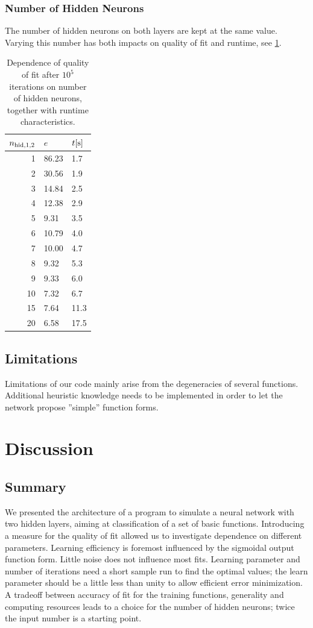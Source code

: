 \documentclass[useAMS,usenatbib]{mn2e}
\begin{document}
\subsubsection{Number of Hidden Neurons}
The number of hidden neurons on both layers are kept at the same
value. Varying this number has both impacts on quality of fit and
runtime, see \ref{tab:run}.
\begin{table}
\begin{center}
\begin{tabular}{rll}\hline\hline
$n_{{\rm hid,1,2}}$&$e$&$t[{\rm s}]$\\
\hline
 1&86.23& 1.7\\
 2&30.56& 1.9\\
 3&14.84& 2.5\\
 4&12.38& 2.9\\
 5& 9.31& 3.5\\
 6&10.79& 4.0\\
 7&10.00& 4.7\\
 8& 9.32& 5.3\\
 9& 9.33& 6.0\\
10& 7.32& 6.7\\
\hline
15& 7.64&11.3\\
\hline
20& 6.58&17.5\\
\hline
\end{tabular}
\end{center}
\caption{\label{tab:run}Dependence of quality of fit after $10^5$ iterations on number of hidden neurons, together with runtime characteristics.}
\end{table}
%
\subsection{Limitations}
Limitations of our code mainly arise from the degeneracies of several
functions. Additional heuristic knowledge needs to be implemented in
order to let the network propose ''simple'' function forms.
%
\section{Discussion}
\label{sec:Discussion}
%
%
\subsection{Summary}
We presented the architecture of a program to simulate a neural
network with two hidden layers, aiming at classification of a set of
basic functions. Introducing a measure for the quality of fit allowed
us to investigate dependence on different parameters. Learning
efficiency is foremost influenced by the sigmoidal output function
form. Little noise does not influence most fits. Learning parameter
and number of iterations need a short sample run to find the optimal
values; the learn parameter should be a little less than unity to
allow efficient error minimization. A tradeoff between accuracy of fit
for the training functions, generality and computing resources leads
to a choice for the number of hidden neurons; twice the input number
is a starting point.
%
%
\end{document}
